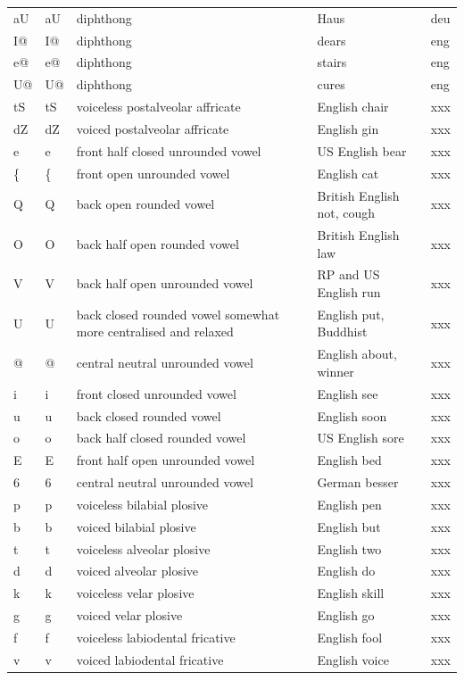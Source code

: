 \documentclass[twoside,a4paper]{book}
\begin{document}
\begin{longtable}{llp{}ll}
	aU & aU & diphthong & Haus & deu\\
	I@ & I@ & diphthong & dears & eng\\
	e@ & e@ & diphthong & stairs & eng\\
	U@ & U@ & diphthong & cures & eng\\
	tS & tS & voiceless postalveolar affricate & English chair & xxx\\
	dZ & dZ & voiced postalveolar affricate & English gin & xxx\\
	e & e & front half closed unrounded vowel & US English bear & xxx\\
	\{ & \{ & front open unrounded vowel & English cat & xxx\\
	Q & Q & back open rounded vowel & British English not, cough & xxx\\
	O & O & back half open rounded vowel & British English law & xxx\\
	V & V & back half open unrounded vowel & RP and US English run & xxx\\
	U & U & back closed rounded vowel somewhat more centralised and relaxed & English put, Buddhist & xxx\\
	@ & @ & central neutral unrounded vowel & English about, winner & xxx\\
	i & i & front closed unrounded vowel & English see & xxx\\
	u & u & back closed rounded vowel & English soon & xxx\\
	o & o & back half closed rounded vowel & US English sore & xxx\\
	E & E & front half open unrounded vowel & English bed & xxx\\
	6 & 6 & central neutral unrounded vowel & German besser & xxx\\
	p & p & voiceless bilabial plosive & English pen & xxx\\
	b & b & voiced bilabial plosive & English but & xxx\\
	t & t & voiceless alveolar plosive & English two & xxx\\
	d & d & voiced alveolar plosive & English do & xxx\\
	k & k & voiceless velar plosive & English skill & xxx\\
	g & g & voiced velar plosive & English go & xxx\\
	f & f & voiceless labiodental fricative & English fool & xxx\\
	v & v & voiced labiodental fricative & English voice & xxx\\

\end{longtable}
\end{document}
